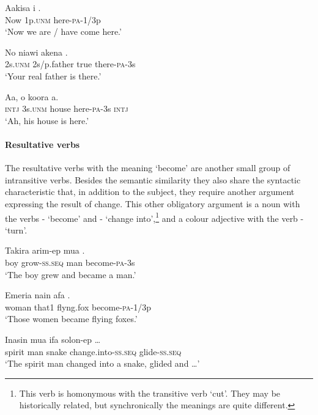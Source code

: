 \ea%
\label{ex:3:x1271}
\gll Aakisa i . \\
Now 1p.\textsc{unm} here-\textsc{pa}-1/3p \\
\glt`Now we are / have come here.'
\z

\ea%
\label{ex:3:x1272}
\gll No niawi akena . \\
2s.\textsc{unm} 2s/p.father true there-\textsc{pa}-3s\\
\glt`Your real father is there.'
\z

\ea%
\label{ex:3:x1276}
\gll Aa, o koora  a. \\
\textsc{intj} 3s.\textsc{unm} house here-\textsc{pa}-3s \textsc{intj}\\
\glt`Ah, his house is here.'
\z

\paragraph{Resultative verbs}\label{sec:3.8.4.4.4}
{}
The resultative verbs with the meaning `become' are another small group of intransitive verbs. Besides the semantic similarity they also share the syntactic characteristic that, in addition to the subject, they require another argument expressing the result of change. This other obligatory argument is a noun with the verbs - `become' and - `change into',\footnote{This verb is homonymous with the transitive verb  `cut'. They may be historically related, but synchronically the meanings are quite different.} and a colour adjective with the verb - `turn'. 

\ea%
\label{ex:3:x276}
\gll Takira arim-ep mua . \\
boy grow-\textsc{ss}.\textsc{seq} man become-\textsc{pa}-3s \\
\glt`The boy grew and became a man.'
\z

\ea%
\label{ex:3:x277}
\gll Emeria nain afa . \\
woman that1 flyng.fox become-\textsc{pa}-1/3p \\
\glt`Those women became flying foxes.'
\z

\ea%
\label{ex:3:x278}
\gll Inasin mua ifa  solon-ep {\dots} \\
spirit man snake change.into-\textsc{ss}.\textsc{seq} glide-\textsc{ss}.\textsc{seq} \\
\glt`The spirit man changed into a snake, glided and {\dots}'
\z

